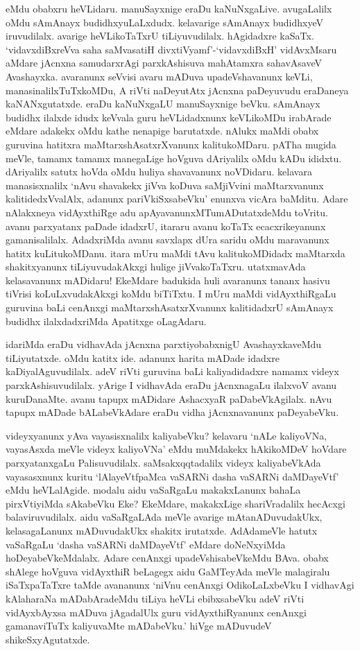 eMdu obabxru heVLidaru. manuSayxnige eraDu kaNuNxgaLive. avugaLalilx oMdu sAmAnayx budidhxyuLaLxdudx. kelavarige sAmAnayx budidhxyeV 
iruvudilalx. avarige heVLikoTaTxrU tiLiyuvudilalx. hAgidadxre kaSaTx. `vidavxdiBxreVva saha saMvasatiH divxtiVyamf'-`vidavxdiBxH' vidAvxMsaru aMdare jAcnxna 
samudarxrAgi parxkAshisuva mahAtamxra sahavAsaveV Avashayxka. avaranunx seVvisi avaru mADuva upadeVshavanunx keVLi, manasinalilxTuTxkoMDu, A 
riVti naDeyutAtx jAcnxna paDeyuvudu eraDaneya kaNANxgutatxde. eraDu kaNuNxgaLU manuSayxnige beVku. sAmAnayx budidhx ilalxde 
idudx keVvala guru heVLidadxnunx keVLikoMDu irabArade eMdare adakekx oMdu kathe nenapige barutatxde. nAlukx maMdi obabx guruvina 
hatitxra maMtarxshAsatxrXvanunx kalitukoMDaru. pATha mugida meVle, tamamx tamamx manegaLige hoVguva dAriyalilx oMdu kADu 
ididxtu. dAriyalilx satutx hoVda oMdu huliya shavavanunx noVDidaru. kelavara manasisxnalilx `nAvu shavakekx jiVva koDuva saMjiVvini 
maMtarxvanunx kalitidedxVvalAlx, adanunx pariVkiSxsabeVku' enunxva vicAra baMditu. Adare nAlakxneya vidAyxthiRge adu 
apAyavanunxMTumADutatxdeMdu toVritu. avanu parxyatanx paDade idadxrU, itararu avanu koTaTx ecacxrikeyanunx gamanisalilalx. AdadxriMda avanu savxlapx dUra saridu oMdu maravanunx hatitx kuLitukoMDanu. itara mUru maMdi tAvu kalitukoMDidadx maMtarxda shakitxyanunx tiLiyuvudakAkxgi hulige jiVvakoTaTxru. utatxmavAda kelasavanunx mADidaru! EkeMdare badukida huli avaranunx tananx hasivu tiVrisi koLuLxvudakAkxgi koMdu biTiTxtu. I mUru maMdi vidAyxthiRgaLu guruvina baLi cenAnxgi maMtarxshAsatxrXvanunx kalitidadxrU sAmAnayx budidhx ilalxdadxriMda Apatitxge oLagAdaru. 

idariMda eraDu vidhavAda jAcnxna parxtiyobabxnigU AvashayxkaveMdu tiLiyutatxde. oMdu katitx ide. adanunx harita mADade idadxre 
kaDiyalAguvudilalx. adeV riVti guruvina baLi kaliyadidadxre namamx videyx parxkAshisuvudilalx. yArige I vidhavAda eraDu jAcnxnagaLu 
ilalxvoV avanu kuruDanaMte. avanu tapupx mADidare AshacxyaR paDabeVkAgilalx. nAvu tapupx mADade bALabeVkAdare eraDu vidha jAcnxnavanunx paDeyabeVku.

videyxyanunx yAva vayasisxnalilx kaliyabeVku? kelavaru `nALe kaliyoVNa, vayasAsxda meVle videyx kaliyoVNa' eMdu muMdakekx 
hAkikoMDeV hoVdare parxyatanxgaLu Palisuvudilalx. saMsakxqqtadalilx videyx kaliyabeVkAda vayasasxnunx kuritu `lAlayeVtfpaMca 
vaSARNi dasha vaSARNi daMDayeVtf' eMdu heVLalAgide. modalu aidu vaSaRgaLu makakxLanunx bahaLa pirxVtiyiMda sAkabeVku Eke? EkeMdare, 
makakxLige shariVradalilx hecAcxgi balaviruvudilalx. aidu vaSaRgaLAda meVle avarige mAtanADuvudakUkx, kelasagaLanunx mADuvudakUkx 
shakitx irutatxde. AdAdameVle hatutx vaSaRgaLu `dasha vaSARNi daMDayeVtf' eMdare doNeNxyiMda hoDeyabeVkeMdalalx. Adare 
cenAnxgi upadeVshisabeVkeMdu BAva. obabx shAlege hoVguva vidAyxthiR beLagegx aidu GaMTeyAda meVle malagiralu iSaTxpaTaTxre taMde avananunx 
`niVnu cenAnxgi OdikoLaLxbeVku I vidhavAgi kAlaharaNa mADabAradeMdu tiLiya heVLi ebibxsabeVku adeV riVti vidAyxbAyxsa mADuva jAgadalUlx guru 
vidAyxthiRyanunx cenAnxgi gamanaviTuTx kaliyuvaMte mADabeVku.' hiVge mADuvudeV shikeSxyAgutatxde.    

